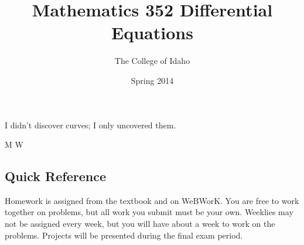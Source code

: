 \documentclass[symmetric]{tufte-handout}
\title{Mathematics 352 Differential Equations}
\date{Spring 2014}
\author{The College of Idaho}
\begin{document}
\maketitle

\newcommand{\officehours}{TBA}

\setlength{\epigraphwidth}{0.7\linewidth}
\renewcommand{\epigraphsize}{\normalsize}
\setlength{\epigraphrule}{0pt}
\setlength{\beforeepigraphskip}{0\baselineskip}
\setlength{\afterepigraphskip}{0\baselineskip}

\begin{fullwidth}
\epigraph{%
    I didn't discover curves; I only uncovered them.%
}{M W}
\end{fullwidth}

\subsection{Quick Reference} \label{ssec:quickreference}
    \begin{minipage}[t]{0.44\linewidth}
        \vspace{0pt}
        Homework is assigned from the textbook and on WeBWorK. 
        You are free to work together on problems, but all work
        you submit must be your own. Weeklies may not be assigned
        every week, but you will have about a week to work on the
        problems. Projects will be presented during the final exam
        period.
    \end{minipage} \hspace{1em}
\end{document}
